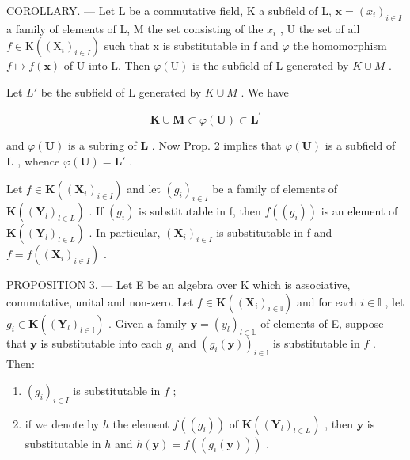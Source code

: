 COROLLARY. --- Let L be a commutative field, K a subfield of L, \(\mathbf{x} = (x_i)_{i \in I}\) a family of elements of L, M the set consisting of the \(x_i\) , U the set of all \(f \in \mathrm{K}((\mathrm{X}_i)_{i \in I})\) such that x is substitutable in f and \(\varphi\) the homomorphism \(f \mapsto f(\mathbf{x})\) of U into L. Then \(\varphi(\mathrm{U})\) is the subfield of L generated by \(K \cup M\) .

Let \(L'\) be the subfield of L generated by \(K \cup M\) . We have

\[
\mathbf {K} \cup \mathbf {M} \subset \varphi (\mathbf {U}) \subset \mathbf {L} ^ {\prime}
\]

and \(\varphi(\mathbf{U})\) is a subring of \(\mathbf{L}\) . Now Prop. 2 implies that \(\varphi(\mathbf{U})\) is a subfield of \(\mathbf{L}\) , whence \(\varphi(\mathbf{U}) = \mathbf{L}'\) .

Let \(f \in \mathbf{K}((\mathbf{X}_i)_{i \in I})\) and let \((g_i)_{i \in I}\) be a family of elements of \(\mathbf{K}((\mathbf{Y}_l)_{l \in L})\) . If \((g_{i})\) is substitutable in f, then \(f((g_{i}))\) is an element of \(\mathbf{K}((\mathbf{Y}_{l})_{l\in L})\) . In particular, \((\mathbf{X}_{i})_{i\in I}\) is substitutable in f and \(f=f((\mathbf{X}_{i})_{i\in I})\) .

PROPOSITION 3. --- Let E be an algebra over K which is associative, commutative, unital and non-zero. Let \(f \in \mathbf{K}((\mathbf{X}_i)_{i \in \mathbb{I}})\) and for each \(i \in \mathbb{I}\) , let \(g_i \in \mathbf{K}((\mathbf{Y}_l)_{l \in \mathbb{I}})\) . Given a family \(\mathbf{y} = (y_l)_{l \in \mathbb{L}}\) of elements of E, suppose that \(\mathbf{y}\) is substitutable into each \(g_i\) and \((g_i(\mathbf{y}))_{i \in \mathbb{I}}\) is substitutable in \(f\) . Then:

\begin{enumerate}
\def\labelenumi{(\roman{enumi})}
\item
  \((g_{i})_{i\in I}\) is substitutable in \(f\) ;
\item
  if we denote by \(h\) the element \(f((g_i))\) of \(\mathbf{K}((\mathbf{Y}_l)_{l \in L})\) , then \(\mathbf{y}\) is substitutable in \(h\) and \(h(\mathbf{y}) = f((g_i(\mathbf{y})))\) .
\end{enumerate}

